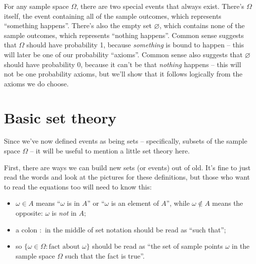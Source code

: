 \documentclass[
  a4paper,
]{book}
\providecommand{\tightlist}{%
  \setlength{\itemsep}{0pt}\setlength{\parskip}{0pt}}
\theoremstyle{definition}
\theoremstyle{definition}
\theoremstyle{definition}
\theoremstyle{definition}
\theoremstyle{remark}
\begin{document}
For any sample space \(\Omega\), there are two special events that always exist. There's \(\Omega\) itself, the event containing all of the sample outcomes, which represents ``something happens''. There's also the empty set \(\varnothing\), which contains none of the sample outcomes, which represents ``nothing happens''. Common sense suggests that \(\Omega\) should have probability 1, because \emph{something} is bound to happen -- this will later be one of our probability ``axioms''. Common sense also suggests that \(\varnothing\) should have probability 0, because it can't be that \emph{nothing} happens -- this will not be one probability axioms, but we'll show that it follows logically from the axioms we do choose.

\hypertarget{set-theory}{%
\section{Basic set theory}\label{set-theory}}

Since we've now defined events as being sets -- specifically, subsets of the sample space \(\Omega\) -- it will be useful to mention a little set theory here.

First, there are ways we can build new sets (or events) out of old. It's fine to just read the words and look at the pictures for these definitions, but those who want to read the equations too will need to know this:

\begin{itemize}
\tightlist
\item
  \(\omega \in A\) means ``\(\omega\) is in \(A\)'' or ``\(\omega\) is an element of \(A\)'', while \(\omega \not\in A\) means the opposite: \(\omega\) is \emph{not} in \(A\);
\item
  a colon \(:\) in the middle of set notation should be read as ``such that'';
\item
  so \(\{\omega \in \Omega : \text{fact about $\omega$}\}\) should be read as ``the set of sample points \(\omega\) in the sample space \(\Omega\) such that the fact is true''.
\end{itemize}
\end{document}
